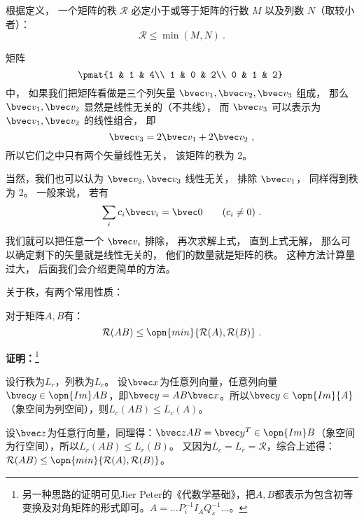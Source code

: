 \begin{theorem}{}
根据定义， 一个矩阵的秩 $\mathcal R$ 必定小于或等于矩阵的行数 $M$ 以及列数 $N$（取较小者）：
\begin{equation}
\mathcal R\leq \min (M, N)~.
\end{equation}
\end{theorem}

\begin{example}{}
矩阵
\begin{equation}\label{eq_MatRnk_1}
\pmat{1 & 1 & 4\\ 1 & 0 & 2\\ 0 & 1 & 2}~
\end{equation}
中， 如果我们把矩阵看做是三个列矢量 $\bvec v_1, \bvec v_2, \bvec v_3$ 组成， 那么 $\bvec v_1, \bvec v_2$ 显然是线性无关的（不共线）， 而 $\bvec v_3$ 可以表示为 $\bvec v_1, \bvec v_2$ 的线性组合， 即
\begin{equation}
\bvec v_3 = 2\bvec v_1 + 2\bvec v_2~,
\end{equation}
所以它们之中只有两个矢量线性无关， 该矩阵的秩为 2。

当然，我们也可以认为 $\bvec v_2, \bvec v_3$ 线性无关， 排除 $\bvec v_1$， 同样得到秩为 2。 一般来说， 若有
\begin{equation}
\sum_i c_i \bvec v_i = \bvec 0 \qquad (c_i \ne 0)~.
\end{equation}
我们就可以把任意一个 $\bvec v_i$ 排除， 再次求解上式， 直到上式无解， 那么可以确定剩下的矢量就是线性无关的， 他们的数量就是矩阵的秩。 这种方法计算量过大， 后面我们会介绍更简单的方法。
\end{example}
关于秩，有两个常用性质：
\begin{theorem}{}
对于矩阵$A,B$有：
\begin{equation}
\mathcal R(AB)\le\opn{min}\{\mathcal R(A),\mathcal R(B)\}~.
\end{equation}
\end{theorem}
\textbf{证明：}\footnote{另一种思路的证明可见Jier Peter的《代数学基础》，把$A,B$都表示为包含初等变换及对角矩阵的形式即可。$A=...P^{-1}_iI_AQ^{-1}_s...$。}

设行秩为$L_r$，列秩为$L_c$。
设$\bvec x$为任意列向量，任意列向量$\bvec y\in \opn{Im}AB$，即$\bvec y=AB\bvec x$。所以$\bvec y\in \opn{Im}{A}$（象空间为列空间），则$ L_c(AB)\leq L_c(A)$。

设$\bvec z$为任意行向量，同理得：$\bvec z AB=\bvec y^T\in \opn {Im}B$（象空间为行空间），所以$L_r(AB)\leq L_r(B)$。
又因为$L_c=L_r=\mathcal R$，综合上述得：$\mathcal R(AB)\le\opn{min}\{\mathcal R(A),\mathcal R(B)\}$。

